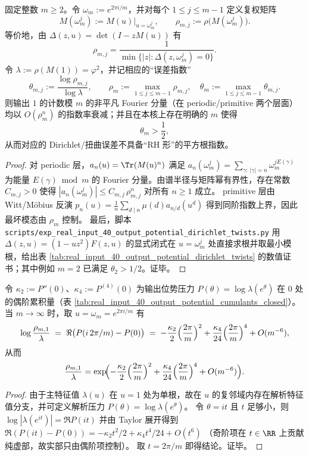 \begin{proposition}\label{prop:real-input-40-output-dirichlet-nonrh}
固定整数 \(m\ge 2\)。令 \(\omega_m:=e^{2\pi i/m}\)，并对每个 \(1\le j\le m-1\) 定义复权矩阵
\[
M(\omega_m^j):=M(u)\big|_{u=\omega_m^j},
\qquad
\rho_{m,j}:=\rho\!\bigl(M(\omega_m^j)\bigr).
\]
等价地，由 \(\Delta(z,u)=\det(I-zM(u))\) 有
\[
\rho_{m,j}=\frac{1}{\min\{|z|:\Delta(z,\omega_m^j)=0\}}.
\]
令 \(\lambda:=\rho(M(1))=\varphi^2\)，并记相应的“误差指数”
\[
\theta_{m,j}:=\frac{\log \rho_{m,j}}{\log \lambda},
\qquad
\rho_m:=\max_{1\le j\le m-1}\rho_{m,j},\quad
\theta_m:=\max_{1\le j\le m-1}\theta_{m,j}.
\]
则输出 \(1\) 的计数模 \(m\) 的非平凡 Fourier 分量（在 periodic/primitive 两个层面）均以 \(O(\rho_m^n)\) 的指数率衰减；并且在本核上存在明确的 \(m\) 使得
\[
\theta_m>\frac12,
\]
从而对应的 Dirichlet/扭曲误差不具备“RH 形”的平方根指数。
\end{proposition}
\begin{proof}
对 periodic 层，\(a_n(u)=\Tr(M(u)^n)\) 满足
\(
a_n(\omega_m^j)=\sum_{\gamma:\,|\gamma|=n}\omega_m^{jE(\gamma)}
\)
为能量 \(E(\gamma)\bmod m\) 的 Fourier 分量。由谱半径与矩阵幂有界性，存在常数 \(C_{m,j}>0\) 使得
\(
|a_n(\omega_m^j)|\le C_{m,j}\,\rho_{m,j}^n
\)
对所有 \(n\ge 1\) 成立。
primitive 层由 Witt/Möbius 反演
\(
p_n(u)=\frac1n\sum_{d\mid n}\mu(d)a_{n/d}(u^d)
\)
得到同阶指数上界，因此最坏模态由 \(\rho_m\) 控制。
最后，脚本 \texttt{scripts/exp\_real\_input\_40\_output\_potential\_dirichlet\_twists.py} 用 \(\Delta(z,u)=(1-uz^2)F(z,u)\) 的显式闭式在 \(u=\omega_m^j\) 处直接求根并取最小模根，给出表 \ref{tab:real_input_40_output_potential_dirichlet_twists} 的数值证书；其中例如 \(m=2\) 已满足 \(\theta_2>1/2\)。证毕。
\end{proof}



\begin{corollary}\label{cor:real-input-40-output-dirichlet-cumulant-bridge}
令 \(\kappa_2:=P''(0)\)、\(\kappa_4:=P^{(4)}(0)\) 为输出位势压力 \(P(\theta)=\log\lambda(e^\theta)\) 在 \(0\) 处的偶阶累积量（表 \ref{tab:real_input_40_output_potential_cumulants_closed}）。
当 \(m\to\infty\) 时，取 \(u=\omega_m=e^{2\pi i/m}\) 有
\[
\log\frac{\rho_{m,1}}{\lambda}
\;=\;
\Re\bigl(P(i\,2\pi/m)-P(0)\bigr)
\;=\;
-\frac{\kappa_2}{2}\Bigl(\frac{2\pi}{m}\Bigr)^2
+\frac{\kappa_4}{24}\Bigl(\frac{2\pi}{m}\Bigr)^4
+O(m^{-6}),
\]
从而
\[
\frac{\rho_{m,1}}{\lambda}
=\exp\!\Bigl(
-\frac{\kappa_2}{2}\Bigl(\frac{2\pi}{m}\Bigr)^2
+\frac{\kappa_4}{24}\Bigl(\frac{2\pi}{m}\Bigr)^4
+O(m^{-6})
\Bigr).
\]
\end{corollary}
\begin{proof}
由于主特征值 \(\lambda(u)\) 在 \(u=1\) 处为单根，故在 \(u\) 的复邻域内存在解析特征值分支，并可定义解析压力 \(P(\theta)=\log\lambda(e^\theta)\)。
令 \(\theta=i t\) 且 \(t\) 足够小，则
\(
\log|\lambda(e^{it})|=\Re P(it)
\)
并由 Taylor 展开得到
\(
\Re(P(it)-P(0))=-\kappa_2 t^2/2+\kappa_4 t^4/24+O(t^6)
\)
（奇阶项在 \(t\in\RR\) 上贡献纯虚部，故实部只由偶阶项控制）。
取 \(t=2\pi/m\) 即得结论。证毕。
\end{proof}

